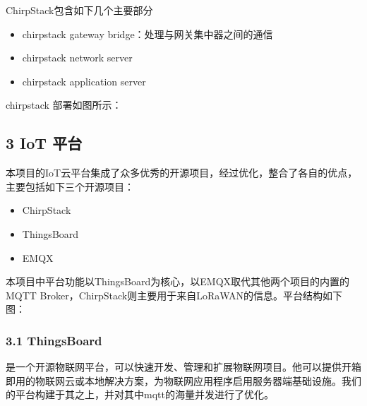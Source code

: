 \documentclass[a4paper,12pt,english]{sphinxmanual}
\begin{document}
\sphinxAtStartPar
ChirpStack包含如下几个主要部分
\begin{itemize}
\item {} 
\sphinxAtStartPar
chirpstack gateway bridge：处理与网关集中器之间的通信

\item {} 
\sphinxAtStartPar
chirpstack network server

\item {} 
\sphinxAtStartPar
chirpstack application server

\end{itemize}

\sphinxAtStartPar
chirpstack 部署如图所示：

\sphinxAtStartPar
{}






\subsection{3 IoT 平台}
\label{\detokenize{dev-board/arch:iot}}
\sphinxAtStartPar
本项目的IoT云平台集成了众多优秀的开源项目，经过优化，整合了各自的优点，主要包括如下三个开源项目：
\begin{itemize}
\item {} 
\sphinxAtStartPar
ChirpStack

\item {} 
\sphinxAtStartPar
ThingsBoard

\item {} 
\sphinxAtStartPar
EMQX

\end{itemize}

\sphinxAtStartPar
本项目中平台功能以ThingsBoard为核心，以EMQX取代其他两个项目的内置的MQTT Broker，ChirpStack则主要用于来自LoRaWAN的信息。平台结构如下图：

\sphinxAtStartPar
{}


\subsubsection{3.1 ThingsBoard}
\label{\detokenize{dev-board/arch:thingsboard}}
\sphinxAtStartPar
{}是一个开源物联网平台，可以快速开发、管理和扩展物联网项目。他可以提供开箱即用的物联网云或本地解决方案，为物联网应用程序启用服务器端基础设施。我们的平台构建于其之上，并对其中mqtt的海量并发进行了优化。
\end{document}
